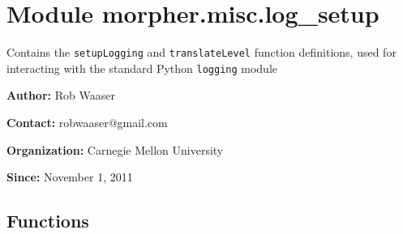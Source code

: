 %
%
%


\section{Module morpher.misc.log\_setup}

    \label{morpher:misc:log_setup}
Contains the \texttt{setupLogging} and \texttt{translateLevel} function 
definitions, used for interacting with the standard Python \texttt{logging}
module

\textbf{Author:} Rob Waaser



\textbf{Contact:} robwaaser@gmail.com



\textbf{Organization:} Carnegie Mellon University



\textbf{Since:} November 1, 2011





  \subsection{Functions}

    \label{morpher:misc:log_setup:setupLogging}

    \vspace{0.5ex}

